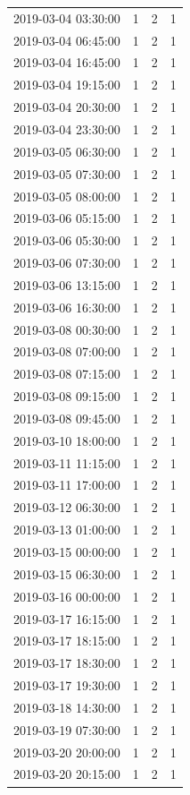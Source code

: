 \begin{tabular}{lrrr}
2019-03-04 03:30:00 & 1 & 2 & 1 \\
2019-03-04 06:45:00 & 1 & 2 & 1 \\
2019-03-04 16:45:00 & 1 & 2 & 1 \\
2019-03-04 19:15:00 & 1 & 2 & 1 \\
2019-03-04 20:30:00 & 1 & 2 & 1 \\
2019-03-04 23:30:00 & 1 & 2 & 1 \\
2019-03-05 06:30:00 & 1 & 2 & 1 \\
2019-03-05 07:30:00 & 1 & 2 & 1 \\
2019-03-05 08:00:00 & 1 & 2 & 1 \\
2019-03-06 05:15:00 & 1 & 2 & 1 \\
2019-03-06 05:30:00 & 1 & 2 & 1 \\
2019-03-06 07:30:00 & 1 & 2 & 1 \\
2019-03-06 13:15:00 & 1 & 2 & 1 \\
2019-03-06 16:30:00 & 1 & 2 & 1 \\
2019-03-08 00:30:00 & 1 & 2 & 1 \\
2019-03-08 07:00:00 & 1 & 2 & 1 \\
2019-03-08 07:15:00 & 1 & 2 & 1 \\
2019-03-08 09:15:00 & 1 & 2 & 1 \\
2019-03-08 09:45:00 & 1 & 2 & 1 \\
2019-03-10 18:00:00 & 1 & 2 & 1 \\
2019-03-11 11:15:00 & 1 & 2 & 1 \\
2019-03-11 17:00:00 & 1 & 2 & 1 \\
2019-03-12 06:30:00 & 1 & 2 & 1 \\
2019-03-13 01:00:00 & 1 & 2 & 1 \\
2019-03-15 00:00:00 & 1 & 2 & 1 \\
2019-03-15 06:30:00 & 1 & 2 & 1 \\
2019-03-16 00:00:00 & 1 & 2 & 1 \\
2019-03-17 16:15:00 & 1 & 2 & 1 \\
2019-03-17 18:15:00 & 1 & 2 & 1 \\
2019-03-17 18:30:00 & 1 & 2 & 1 \\
2019-03-17 19:30:00 & 1 & 2 & 1 \\
2019-03-18 14:30:00 & 1 & 2 & 1 \\
2019-03-19 07:30:00 & 1 & 2 & 1 \\
2019-03-20 20:00:00 & 1 & 2 & 1 \\
2019-03-20 20:15:00 & 1 & 2 & 1 \\

\end{tabular}
